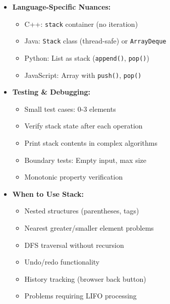 \documentclass[a4paper,10pt]{book}
\begin{document}
\begin{itemize}
    \item \textbf{Language-Specific Nuances:}
    \begin{itemize}
        \item C++: \texttt{stack} container (no iteration)
        \item Java: \texttt{Stack} class (thread-safe) or \texttt{ArrayDeque}
        \item Python: List as stack (\texttt{append()}, \texttt{pop()})
        \item JavaScript: Array with \texttt{push()}, \texttt{pop()}
    \end{itemize}
    
    \item \textbf{Testing \& Debugging:}
    \begin{itemize}
        \item Small test cases: 0-3 elements
        \item Verify stack state after each operation
        \item Print stack contents in complex algorithms
        \item Boundary tests: Empty input, max size
        \item Monotonic property verification
    \end{itemize}
    
    \item \textbf{When to Use Stack:}
    \begin{itemize}
        \item Nested structures (parentheses, tags)
        \item Nearest greater/smaller element problems
        \item DFS traversal without recursion
        \item Undo/redo functionality
        \item History tracking (browser back button)
        \item Problems requiring LIFO processing
    \end{itemize}
\end{itemize}
\end{document}
